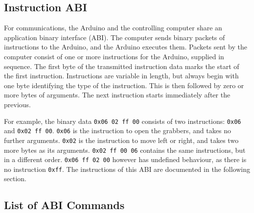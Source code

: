 \newcommand{\abispec}[6]{
\subsubsection{\texttt{#1}}
\begin{table}[H]
\begin{tabularx}{\textwidth}{lX}
\textbf{Instruction byte:}               & \texttt{#2} \\
\textbf{Argument bytes:}                 & #3 \\
\textbf{Argument type(s):}               & \texttt{#4} \\
\textbf{Action:}                         & #5 \\
\textbf{Low-Level Commands:} & #6 \\
\end{tabularx}
\end{table}
}

\subsection{Instruction ABI}

For communications, the Arduino and the controlling computer share an application binary interface (ABI). The computer sends binary packets of instructions to the Arduino, and the Arduino executes them.
Packets sent by the computer consist of one or more instructions for the Arduino, supplied in sequence. The first byte of the transmitted instruction data marks the start of the first instruction. 
Instructions are variable in length, but always begin with one byte identifying the type of the instruction. This is then followed by zero or more bytes of arguments.
The next instruction starts immediately after the previous.

For example, the binary data \texttt{0x06 02 ff 00} consists of two instructions: \texttt{0x06} and \texttt{0x02 ff 00}.
\texttt{0x06} is the instruction to open the grabbers, and takes no further arguments. \texttt{0x02} is the instruction to move left or right, and takes two more bytes as its arguments.
\texttt{0x02 ff 00 06} contains the same instructions, but in a different order. 
\texttt{0x06 ff 02 00} however has undefined behaviour, as there is no instruction \texttt{0xff}. 
The instructions of this ABI are documented in the following section.


\subsection{List of ABI Commands}

